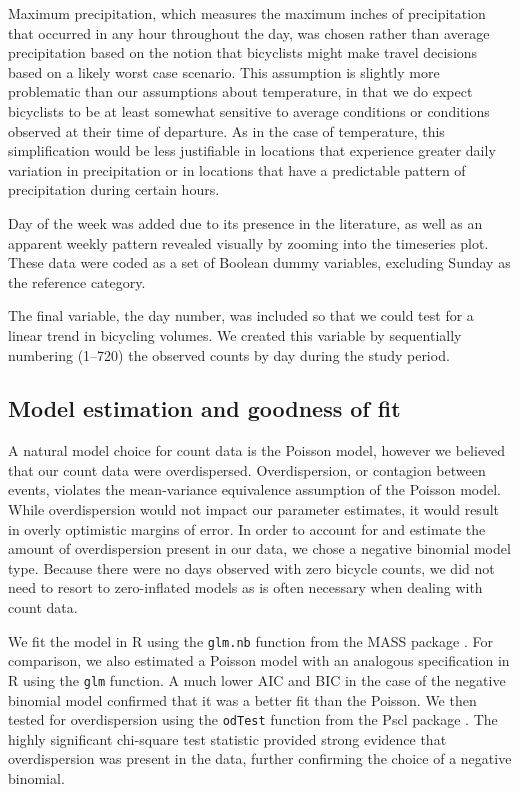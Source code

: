 \documentclass[12pt,letterpaper,article,twocolumn]{memoir}
\begin{document}
Maximum precipitation, which measures the maximum inches of
precipitation that occurred in any hour throughout the day, was chosen
rather than average precipitation based on the notion that bicyclists
might make travel decisions based on a likely worst case scenario.
This assumption is slightly more problematic than our assumptions
about temperature, in that we do expect bicyclists to be at least
somewhat sensitive to average conditions or conditions observed at
their time of departure. As in the case of temperature, this
simplification would be less justifiable in locations that experience
greater daily variation in precipitation or in locations that have a
predictable pattern of precipitation during certain hours.

Day of the week was added due to its presence in the literature, as
well as an apparent weekly pattern revealed visually by zooming into
the timeseries plot. These data were coded as a set of Boolean dummy
variables, excluding Sunday as the reference category.

The final variable, the day number, was included so that we could test
for a linear trend in bicycling volumes. We created this variable by
sequentially numbering (1--720) the observed counts by day during the
study period.

\subsection*{Model estimation and goodness of fit}
A natural model choice for count data is the Poisson model, however we
believed that our count data were overdispersed. Overdispersion, or
contagion between events, violates the mean-variance equivalence
assumption of the Poisson model. While overdispersion would not impact
our parameter estimates, it would result in overly optimistic margins
of error. In order to account for and estimate the amount of
overdispersion present in our data, we chose a negative binomial model
type. Because there were no days observed with zero bicycle counts, we
did not need to resort to zero-inflated models as is often necessary
when dealing with count data.

We fit the model in R using the \texttt{glm.nb} function from the MASS
package \parencite{Venables:2002aa}. For comparison, we also estimated a
Poisson model with an analogous specification in R using the
\texttt{glm} function. A much lower AIC and BIC in the case of the
negative binomial model confirmed that it was a better fit than the
Poisson. We then tested for overdispersion using the \texttt{odTest} function
from the Pscl package \parencite{Jackman:2014aa}. The highly significant
chi-square test statistic provided strong evidence that overdispersion
was present in the data, further confirming the choice of a negative
binomial.
\end{document}
